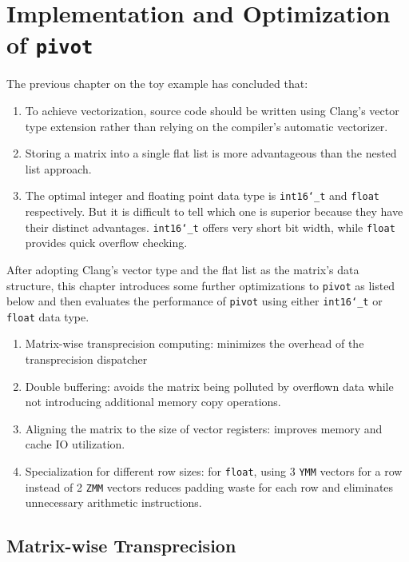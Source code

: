 \documentclass[logo,bsc,singlespacing,parskip]{infthesis}
\newcommand{\dtshort}{\texttt{int16\char`_t}}
\newcommand{\dtfloat}{\texttt{float}}
\newcommand{\pivot}{\texttt{pivot}}
\newcommand{\ymm}{\texttt{YMM}}
\newcommand{\zmm}{\texttt{ZMM}}
\begin{document}
\chapter{Implementation and Optimization of \pivot{}}
\label{sec:pivot-impl}
The previous chapter on the toy example has concluded that:
\begin{enumerate} 
    \item To achieve vectorization, source code should be written using Clang's vector type extension rather than relying on the compiler's automatic vectorizer. 
    \item Storing a matrix into a single flat list is more advantageous than the nested list approach.
    \item The optimal integer and floating point data type is \dtshort{} and \dtfloat{} respectively. But it is difficult to tell which one is superior because they have their distinct advantages. \dtshort{} offers very short bit width, while \dtfloat{} provides quick overflow checking.
\end{enumerate}

After adopting Clang's vector type and the flat list as the matrix's data structure, this chapter introduces some further optimizations to \pivot{} as listed below and then evaluates the performance of \pivot{} using either \dtshort{} or \dtfloat{} data type.

\begin{enumerate} 
    \item Matrix-wise transprecision computing: minimizes the overhead of the transprecision dispatcher
    \item Double buffering: avoids the matrix being polluted by overflown data while not introducing additional memory copy operations. 
    \item Aligning the matrix to the size of vector registers: improves memory and cache IO utilization.
    \item Specialization for different row sizes: for \dtfloat{}, using 3 \ymm{} vectors for a row instead of 2 \zmm{} vectors reduces padding waste for each row and eliminates unnecessary arithmetic instructions.
\end{enumerate}


\section{Matrix-wise Transprecision}
\end{document}

